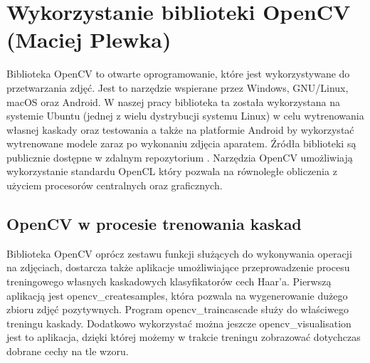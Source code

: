 \section{Wykorzystanie biblioteki OpenCV (Maciej Plewka)}\label{sec:opencv}
Biblioteka OpenCV to otwarte oprogramowanie, które jest wykorzystywane do przetwarzania zdjęć. Jest to narzędzie wspierane przez Windows, GNU/Linux, macOS oraz Android. W naszej pracy biblioteka ta została wykorzystana na systemie Ubuntu (jednej z wielu dystrybucji systemu Linux) w celu wytrenowania własnej kaskady oraz testowania a także na platformie Android by wykorzystać wytrenowane modele zaraz po wykonaniu zdjęcia aparatem. Źródła biblioteki są publicznie dostępne w zdalnym repozytorium \cite{OpenCVSource}. Narzędzia OpenCV umożliwiają wykorzystanie standardu OpenCL który pozwala na równoległe obliczenia z użyciem procesorów centralnych oraz graficznych.


\subsection{OpenCV w procesie trenowania kaskad}

Biblioteka OpenCV oprócz zestawu funkcji służących do wykonywania operacji na zdjęciach, dostarcza także aplikacje umożliwiające przeprowadzenie procesu treningowego własnych kaskadowych klasyfikatorów cech Haar'a. Pierwszą aplikacją jest opencv\_createsamples, która pozwala na wygenerowanie dużego zbioru zdjęć pozytywnych. Program opencv\_traincascade służy do właściwego treningu kaskady. Dodatkowo wykorzystać można jeszcze opencv\_visualisation jest to aplikacja, dzięki której możemy w trakcie treningu zobrazować dotychczas dobrane cechy na tle wzoru.

